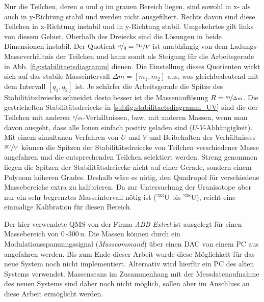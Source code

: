Nur die Teilchen, deren $a$ und $q$ im grauen
Bereich liegen, sind sowohl in x- als auch in y-Richtung stabil und werden nicht
ausgefiltert. Rechts davon sind diese Teilchen in x-Richtung instabil und in
y-Richtung stabil. Umgekehrtes gilt links von diesem Gebiet. Oberhalb des
Dreiecks sind die Lösungen in beide Dimensionen instabil. Der Quotient
$\nicefrac{a}{q}=\nicefrac{2U}{V}$ ist unabhängig von dem Ladungs-Masseverhältnis der Teilchen und kann somit als Steigung für die Arbeitsgerade in Abb.
\ref{fig:stabilitaetsdiagramm} dienen. Die Einstellung dieses Quotienten wirkt
sich auf das stabile Masseintervall $\Delta m=[m_1,m_2]$ aus, was
gleichbedeutend mit dem Intervall $[q_1,q_2]$ ist. Je schärfer die Arbeitsgerade die Spitze des
Stabilitätsdreiecks schneidet desto besser ist die Massenauflösung
$R=\nicefrac{m}{\Delta m}$. Die gestrichelten Stabilitätsdreiecke in
\ref{subfig:stabilitaetsdiagramm_UV} sind die der Teilchen mit anderen
$\nicefrac{e}{m}$-Verhältnissen, bzw. mit anderen Massen, wenn man davon
ausgeht, dass alle Ionen einfach positiv geladen sind ($U$-$V$-Abhängigkeit).
Mit einem simultanen Verfahren von $U$ und $V$ und Beibehalten des Verhältnisses
$\nicefrac{2U}{V}$ können die Spitzen der Stabilitätsdreiecke von Teilchen verschiedener Masse angefahren und die entsprechenden Teilchen
selektiert werden. Streng genommen liegen die Spitzen der
Stabilitätsdreiecke nicht auf einer Gerade, sondern einem Polynom höheren
Grades. Deshalb wäre es nötig, den Quadrupol für verschiedene Massebereiche
extra zu kalibrieren. Da zur Untersuchung der Uranisotope aber nur ein sehr
begrenztes Masseintervall nötig ist ($^{233}$U bis $^{238}$U), reicht eine
einmalige Kalibration für diesen Bereich.\par
Der hier verwendete QMS von der Firma \textit{ABB
Extrel} ist ausgelegt für einen Massebereich von $0\,$-$300\,$u. Die Massen
können durch ein Modulationsspanunngssignal (\textit{Masscommand}) über einen
DAC von einem PC aus angefahren werden. Bis zum Ende dieser Arbeit wurde diese
Möglichkeit für das neue System noch nicht implementiert. Alternativ wird
hierfür ein PC des alten Systems verwendet. Massenscans im Zusammenhang mit der
Messdatenaufnahme des neuen Systems sind daher noch nicht möglich, sollen aber
im Anschluss an diese Arbeit ermöglicht werden.

